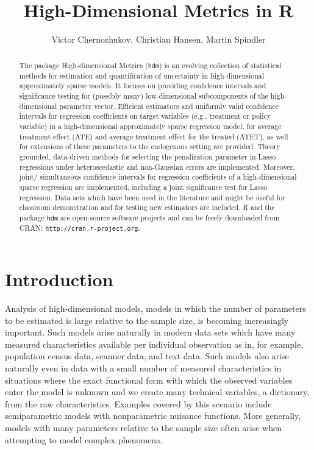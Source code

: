 \documentclass{amsart}\usepackage[]{graphicx}\usepackage[]{color}
\title{High-Dimensional Metrics in R}
\author{Victor Chernozhukov, Christian Hansen, Martin Spindler}
\newcommand{\Rpackage}[1]{{\texttt{#1}}}
\newcommand{\R}{{\normalfont\textsf{R }}{}}
\begin{document}
\begin{abstract}
The package High-dimensional Metrics (\Rpackage{hdm}) is an evolving collection of statistical methods for estimation and quantification of uncertainty in high-dimensional approximately sparse models. It focuses on providing confidence intervals and significance testing for (possibly many) low-dimensional subcomponents of the high-dimensional parameter vector. Efficient estimators and uniformly valid confidence intervals for regression coefficients on target variables (e.g., treatment or policy variable) in a high-dimensional approximately sparse regression model, for average treatment effect (ATE) and average treatment effect for the treated (ATET),  as well for extensions of these parameters to the endogenous setting are provided. 
Theory grounded, data-driven methods for selecting the penalization parameter in Lasso regressions under heteroscedastic and non-Gaussian errors are implemented. Moreover, joint/ simultaneous confidence intervals for regression coefficients of a high-dimensional sparse regression are implemented, including a joint significance test for Lasso regression. Data sets which have been used in the literature and might be useful for classroom demonstration and for testing new estimators are included.  \R and the package \Rpackage{hdm} are open-source software projects and can be freely downloaded from CRAN:
\texttt{http://cran.r-project.org}.
\end{abstract}

\maketitle

\pagestyle{myheadings}
\markboth{\sc High-Dimensional Metrics in \R}{\sc }

\tableofcontents
\section{Introduction}
Analysis of high-dimensional models, models in which the number of parameters to be estimated is large relative to the sample size, is becoming increasingly important. Such models arise naturally in modern data sets which have many measured characteristics available per individual observation as in, for example, population census data, scanner data, and text data.  Such models also arise naturally even in data with a small number of measured characteristics in situations where the exact functional form with which the observed variables enter the model is unknown and we create many technical variables, a dictionary, from the raw characteristics. Examples covered by this scenario include semiparametric models with nonparametric nuisance functions.  More generally, models with many parameters relative to the sample size often arise when attempting to model complex phenomena.
\end{document}
